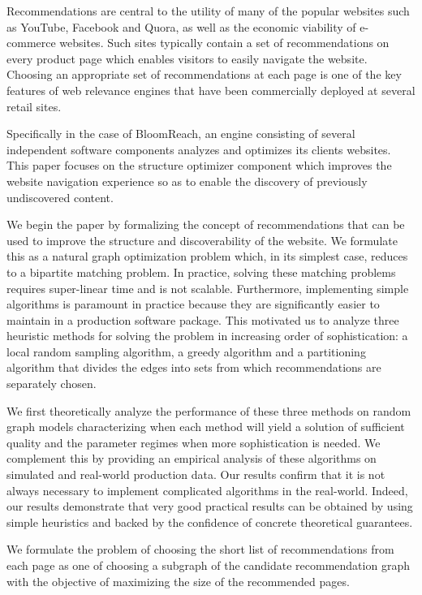 \abstract

Recommendations are central to the utility of many of the popular websites such as YouTube,
Facebook and Quora, as well as the economic viability of e-commerce websites.
Such sites typically contain a set of recommendations on every product
page which enables visitors to easily navigate the website. Choosing
an appropriate set of recommendations at each page is one of the key
features of web relevance engines that have been commercially deployed 
at several retail sites.

Specifically in the case of BloomReach, an engine consisting of several independent
software components analyzes and optimizes its clients websites.
This paper focuses on the structure optimizer component which
improves the website navigation experience so as to enable the discovery of previously
undiscovered content.

We begin the paper by formalizing the concept of recommendations that can be used to improve
the structure and discoverability of the website. We formulate this as a natural graph optimization
problem which, in its simplest case, reduces to a bipartite matching problem. In practice, solving these
matching problems requires super-linear time and is not scalable. Furthermore, implementing simple 
algorithms is paramount in practice because they are
significantly easier to maintain in a production software package. This motivated us to analyze 
three heuristic methods for solving the problem in increasing order of sophistication: 
a local random sampling algorithm,
a greedy algorithm and a partitioning algorithm that divides the edges into sets from which recommendations
are separately chosen.

We first theoretically analyze the performance of these three methods
on random graph models characterizing when each method will yield a solution of sufficient quality
and the parameter regimes when more sophistication is needed. 
We complement this by providing an empirical analysis
of these algorithms on simulated and real-world production data. Our
results confirm that it is not always necessary to implement complicated
algorithms in the real-world. Indeed, our results demonstrate that 
very good practical results 
can be obtained by using simple heuristics and 
backed by the confidence of concrete theoretical guarantees.

\iffalse

We formulate the problem of choosing the short list of recommendations from each page as one of choosing a subgraph of the candidate recommendation graph with the objective of maximizing the size of the recommended pages.

